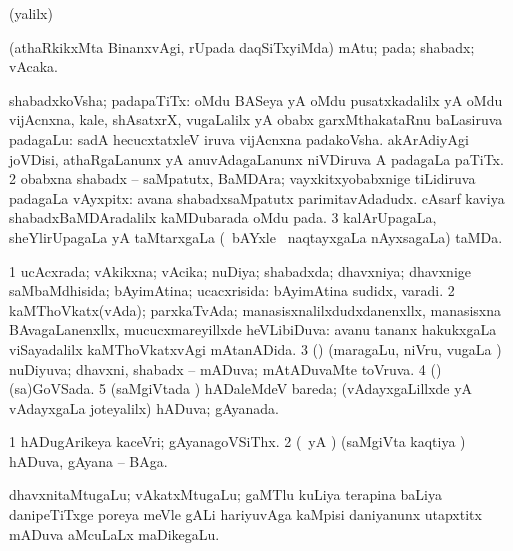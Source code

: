 {{{{{{{{{{{{\bentry
{}
\gl{\saMkiSx}
\expl{}
\bmng
 (\UK yalilx) 
\emng
\eentry

\bentry
{} 
\gl{\nA}
\expl{}
\bmng
 (athaRkikxMta BinanxvAgi, rUpada daqSiTxyiMda) mAtu; pada; shabadx; vAcaka. 
\emng
\eentry

\bentry 
{} 
\gl{\nA}
\bmng
\bnum
{} shabadxkoVsha; padapaTiTx: 
\banum
{} oMdu BASeya yA oMdu pusatxkadalilx yA oMdu vijAcnxna, kale, shAsatxrX, \mo vugaLalilx yA obabx garxMthakataRnu baLasiruva padagaLu:  sadA hecucxtatxleV iruva vijAcnxna padakoVsha. 
 akArAdiyAgi joVDisi, athaRgaLanunx yA anuvAdagaLanunx niVDiruva A padagaLa paTiTx. 
\eanum
\numie
\num{2} obabxna shabadx -- saMpatutx, BaMDAra; vayxkitxyobabxnige tiLidiruva padagaLa vAyxpitx:  avana shabadxsaMpatutx parimitavAdadudx.  cAsarf kaviya shabadxBaMDAradalilx kaMDubarada oMdu pada. 
\num{3} kalArUpagaLa, sheYlirUpagaLa yA taMtarxgaLa (\kanmu\ bAYxle \mo\ naqtayxgaLa nAyxsagaLa) taMDa. 
\enum
\emng
\eentry

\bentry
{} 
\gl{\gu}
\expl{}
\bmng
\bnum
\num{1} ucAcxrada; vAkikxna; vAcika; nuDiya; shabadxda; dhavxniya; dhavxnige saMbaMdhisida; bAyimAtina; ucacxrisida:  bAyimAtina sudidx, varadi. 
\num{2} kaMThoVkatx(vAda); parxkaTvAda; manasisxnalilxdudxdanenxllx, manasisxna BAvagaLanenxllx, mucucxmareyillxde heVLibiDuva:  avanu tananx hakukxgaLa viSayadalilx kaMThoVkatxvAgi mAtanADida. 
\num{3} (\kAparx) (maragaLu, niVru, \mo vugaLa \vi) nuDiyuva; dhavxni, shabadx -- mADuva; mAtADuvaMte toVruva. 
\num{4} (\dhavxni) (sa)GoVSada. 
\num{5} (saMgiVtada \vi) hADaleMdeV bareda; (vAdayxgaLillxde yA vAdayxgaLa joteyalilx) hADuva; gAyanada. 
\enum
\emng
\eentry

\bentry
{} 
\gl{\nA}
\expl{}
\bmng
\bnum
\num{1} hADugArikeya kaceVri; gAyanagoVSiThx. 
\num{2} (\Eva\ yA \bava) (saMgiVta kaqtiya \vi) hADuva, gAyana -- BAga. 
\enum
\emng
\eentry

\bentry 
{} 
\gl{\nA}
\expl{}
\bmng
 dhavxnitaMtugaLu; vAkatxMtugaLu; gaMTlu kuLiya terapina baLiya danipeTiTxge poreya meVle gALi hariyuvAga kaMpisi daniyanunx utapxtitx mADuva aMcuLaLx maDikegaLu. 
\emng
\eentry

}}}}}}}}}}}}
